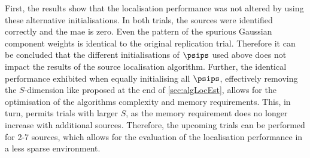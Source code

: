 First, the results show that the localisation performance was not altered by using these alternative initialisations. In both trials, the sources were identified correctly and the \gls{mae} is zero. Even the pattern of the spurious Gaussian component weights is identical to the original replication trial. Therefore it can be concluded that the different initialisations of $\psips$ used above does not impact the results of the source localisation algorithm. Further, the identical performance exhibited when equally initialising all $\psips$, effectively removing the $S$-dimension like proposed at the end of \autoref{sec:algLocEst}, allows for the optimisation of the algorithms complexity and memory requirements. This, in turn, permits trials with larger $S$, as the memory requirement does no longer increase with additional sources. Therefore, the upcoming trials can be performed for 2-7 sources, which allows for the evaluation of the localisation performance in a less sparse environment. \FloatBarrier